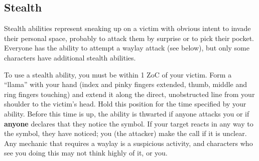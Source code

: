 \documentclass[sheet]{GL2020}
\begin{document}
\subsection{Stealth}

Stealth abilities represent sneaking up on a victim with obvious intent to invade their personal space, probably to attack them by surprise or to pick their pocket. Everyone has the ability to attempt a waylay attack (see below), but only some characters have additional stealth abilities.

To use a stealth ability, you must be within 1 ZoC of your victim. Form a ``llama'' with your hand (index and pinky fingers extended, thumb, middle and ring fingers touching) and extend it along the direct, unobstructed line from your shoulder to the victim's head. Hold this position for the time specified by your ability. Before this time is up, the ability is thwarted if anyone attacks you or if \textbf{anyone} declares that they notice the symbol. If your target reacts in any way to the symbol, they have noticed; you (the attacker) make the call if it is unclear. Any mechanic that requires a waylay is a suspicious activity, and characters who see you doing this may not think highly of it, or you.
\end{document}
